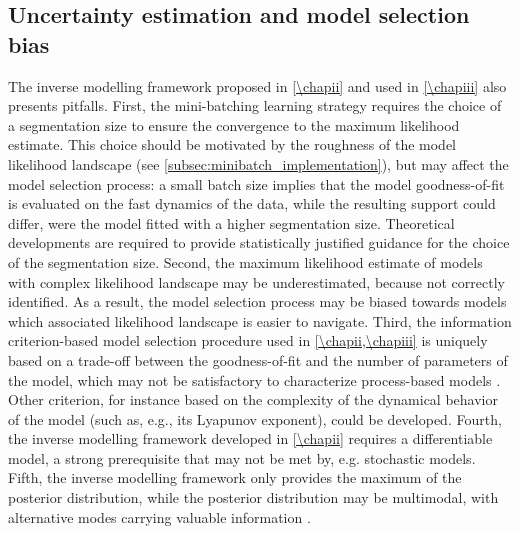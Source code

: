 \subsection{Uncertainty estimation and model selection bias}
The inverse modelling framework proposed in \cref{\chapii} and used in \cref{\chapiii} also presents pitfalls.
%
First, the mini-batching learning strategy requires the choice of a segmentation size to ensure the convergence to the maximum likelihood estimate. This choice should be motivated by the roughness of the model likelihood landscape (see \cref{subsec:minibatch_implementation}), but may affect the model selection process:
% 
a small batch size implies that the model goodness-of-fit is evaluated on the fast dynamics of the data, while the resulting support could differ, were the model fitted with a higher segmentation size. Theoretical developments are required to provide statistically justified guidance for the choice of the segmentation size. 
% 
Second, the maximum likelihood estimate of models with complex likelihood landscape may be underestimated, because not correctly identified. As a result, the model selection process may be biased towards models which associated likelihood landscape is easier to navigate. 
% 
Third, the information criterion-based model selection procedure used in \cref{\chapii,\chapiii} is uniquely based on a trade-off between the goodness-of-fit and the number of parameters of the model, which may not be satisfactory to characterize process-based models \citep{Clermont2015}. 
% 
Other criterion, for instance based on the complexity of the dynamical behavior of the model (such as, e.g., its Lyapunov exponent), could be developed.
% 
Fourth, the inverse modelling framework developed in \cref{\chapii} requires a differentiable model, a strong prerequisite that may not be met by, e.g. stochastic models. 
% 
Fifth, the inverse modelling framework only provides the maximum of the posterior distribution, while the posterior distribution may be multimodal, with alternative modes carrying valuable information \citep{Wilson2020}.%

